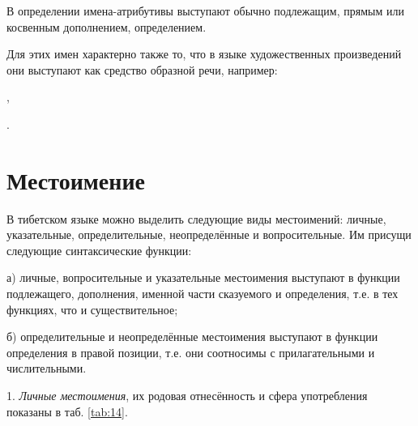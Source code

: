 В определении имена-атрибутивы выступают обычно подлежащим, прямым или косвенным дополнением, определением.

Для этих имен характерно также то, что в языке художественных произведений они выступают как средство образной речи, например:
\begin{prfsample}
    \item {},
    \item {}.
\end{prfsample}

\section{Местоимение}

В тибетском языке можно выделить следующие виды местоимений: личные, указательные, определительные, неопределённые и вопросительные. Им присущи следующие синтаксические функции:

а) личные, вопросительные и указательные местоимения выступают в функции подлежащего, дополнения, именной части сказуемого и определения, т.е. в тех функциях, что и существительное;

б) определительные и неопределённые местоимения выступают в функции определения в правой позиции, т.е. они соотносимы с прилагательными и числительными.

1. \emph{Личные местоимения}, их родовая отнесённость и сфера употребления показаны в  таб. \ref{tab:14}.


